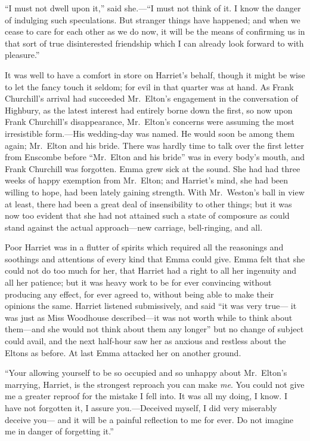 ``I must not dwell upon it,'' said she.---``I must not think of it.
I know the danger of indulging such speculations.  But stranger
things have happened; and when we cease to care for each other
as we do now, it will be the means of confirming us in that sort
of true disinterested friendship which I can already look forward
to with pleasure.''

It was well to have a comfort in store on Harriet's behalf,
though it might be wise to let the fancy touch it seldom; for evil
in that quarter was at hand.  As Frank Churchill's arrival had
succeeded Mr.\ Elton's engagement in the conversation of Highbury,
as the latest interest had entirely borne down the first, so now
upon Frank Churchill's disappearance, Mr.\ Elton's concerns were
assuming the most irresistible form.---His wedding-day was named.
He would soon be among them again; Mr.\ Elton and his bride.
There was hardly time to talk over the first letter from Enscombe
before ``Mr.\ Elton and his bride'' was in every body's mouth,
and Frank Churchill was forgotten.  Emma grew sick at the sound.
She had had three weeks of happy exemption from Mr.\ Elton;
and Harriet's mind, she had been willing to hope, had been lately
gaining strength.  With Mr.\ Weston's ball in view at least,
there had been a great deal of insensibility to other things;
but it was now too evident that she had not attained such a state
of composure as could stand against the actual approach---new carriage,
bell-ringing, and all.

Poor Harriet was in a flutter of spirits which required all the
reasonings and soothings and attentions of every kind that Emma
could give.  Emma felt that she could not do too much for her,
that Harriet had a right to all her ingenuity and all her patience;
but it was heavy work to be for ever convincing without producing
any effect, for ever agreed to, without being able to make their opinions
the same.  Harriet listened submissively, and said ``it was very true---%
it was just as Miss Woodhouse described---it was not worth while to
think about them---and she would not think about them any longer''
but no change of subject could avail, and the next half-hour
saw her as anxious and restless about the Eltons as before.
At last Emma attacked her on another ground.

``Your allowing yourself to be so occupied and so unhappy about
Mr.\ Elton's marrying, Harriet, is the strongest reproach you can
make \emph{me}.  You could not give me a greater reproof for the mistake I
fell into.  It was all my doing, I know.  I have not forgotten it,
I assure you.---Deceived myself, I did very miserably deceive you---%
and it will be a painful reflection to me for ever.  Do not imagine
me in danger of forgetting it.''

